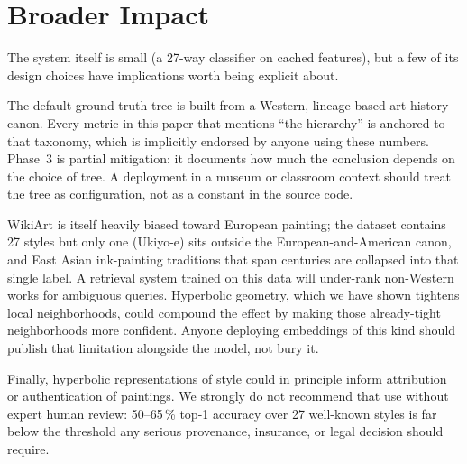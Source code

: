 \section{Broader Impact}
\label{sec:impact}

The system itself is small (a 27-way classifier on cached features),
but a few of its design choices have implications worth being
explicit about.

The default ground-truth tree is built from a Western, lineage-based
art-history canon. Every metric in this paper that mentions ``the
hierarchy'' is anchored to that taxonomy, which is implicitly endorsed
by anyone using these numbers. Phase~3 is partial mitigation: it
documents how much the conclusion depends on the choice of tree. A
deployment in a museum or classroom context should treat the tree as
configuration, not as a constant in the source code.

WikiArt is itself heavily biased toward European painting; the dataset
contains 27 styles but only one (Ukiyo-e) sits outside the
European-and-American canon, and East Asian ink-painting traditions
that span centuries are collapsed into that single label. A retrieval
system trained on this data will under-rank non-Western works for
ambiguous queries. Hyperbolic geometry, which we have shown tightens
local neighborhoods, could compound the effect by making those
already-tight neighborhoods more confident. Anyone deploying
embeddings of this kind should publish that limitation alongside the
model, not bury it.

Finally, hyperbolic representations of style could in principle inform
attribution or authentication of paintings. We strongly do not
recommend that use without expert human review: 50--65\,\% top-1
accuracy over 27 well-known styles is far below the threshold any
serious provenance, insurance, or legal decision should require.
